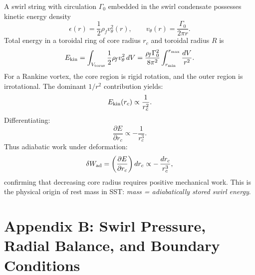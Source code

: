 \documentclass[11pt]{article}
\newcommand{\rhof}{\rho_{\!f}} \newcommand{\rhoF}{\rho_{\!f}}                             %
\newcommand{\rc}{r_c}                                    %
\begin{document}
        A swirl string with circulation $\Gamma_0$ embedded in the swirl condensate
        possesses kinetic energy density
        \begin{equation}
            \epsilon(r) = \frac12 \rhof v_\theta^2(r),
            \qquad
            v_\theta(r) = \frac{\Gamma_0}{2\pi r}.
        \end{equation}
        Total energy in a toroidal ring of core radius $\rc$ and toroidal radius $R$ is
        \begin{equation}
            E_{\rm kin}
            = \int_{V_{\rm torus}} \frac12 \rhof v_\theta^2 \, dV
            = \frac{\rhof \Gamma_0^2}{8\pi^2}
            \int_{r_{\rm min}}^{r_{\rm max}}
            \frac{dV}{r^2}.
        \end{equation}
        For a Rankine vortex, the core region is rigid rotation, and the outer region is
        irrotational. The dominant $1/r^2$ contribution yields:
        \begin{equation}
            E_{\rm kin}(\rc)
            \propto \frac{1}{\rc^2}.
        \end{equation}
        Differentiating:
        \begin{equation}
            \frac{\partial E}{\partial \rc}
            \propto -\frac{1}{\rc^3}.
        \end{equation}
        Thus adiabatic work under deformation:
        \begin{equation}
            \delta W_{\rm ad}
            = \left( \frac{\partial E}{\partial \rc} \right) d\rc
            \propto -\, \frac{d\rc}{\rc^3},
        \end{equation}
        confirming that decreasing core radius requires positive mechanical work.
        This is the physical origin of rest mass in SST:
        \emph{mass = adiabatically stored swirl energy}.

    \section*{Appendix B: Swirl Pressure, Radial Balance, and Boundary Conditions}
\end{document}
